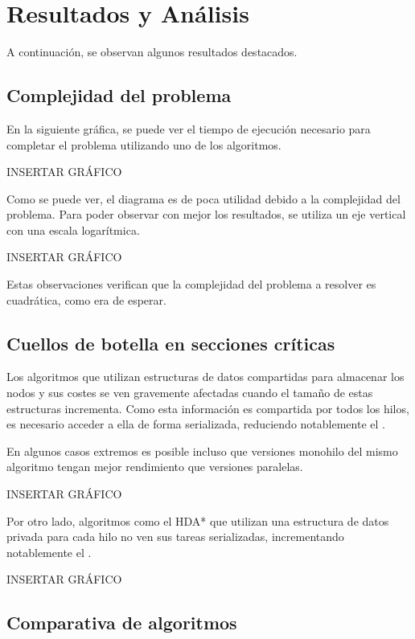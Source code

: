 \section{Resultados y Análisis}

A continuación, se observan algunos resultados destacados.

\subsection{Complejidad del problema}

En la siguiente gráfica, se puede ver el tiempo de ejecución
necesario para completar el problema utilizando uno de los
algoritmos.

INSERTAR GRÁFICO

Como se puede ver, el diagrama es de poca utilidad debido a la
complejidad del problema.
Para poder observar con mejor los resultados,
se utiliza un eje vertical con una escala logarítmica.

INSERTAR GRÁFICO

Estas observaciones verifican que la complejidad del problema
a resolver es cuadrática, como era de esperar.

\subsection{Cuellos de botella en secciones críticas}

Los algoritmos que utilizan estructuras de datos compartidas
para almacenar los nodos y sus costes se ven gravemente
afectadas cuando el tamaño de estas estructuras incrementa.
Como esta información es compartida por todos los hilos,
es necesario acceder a ella de forma serializada,
reduciendo notablemente el .

En algunos casos extremos es posible incluso
que versiones monohilo del mismo algoritmo
tengan mejor rendimiento que versiones paralelas.

INSERTAR GRÁFICO

Por otro lado, algoritmos como el HDA*
que utilizan una estructura de datos privada para cada hilo
no ven sus tareas serializadas,
incrementando notablemente el .

INSERTAR GRÁFICO

\subsection{Comparativa de algoritmos}

